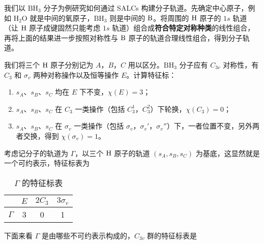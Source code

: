 
我们以 $\text{BH}_3$ 分子为例研究如何通过 SALCs 构建分子轨道。先确定中心原子，例如 $\text{H}_2\text{O}$ 就是中间的氧原子，$\text{BH}_3$ 则是中间的 $\text B$。将周围的 $\text H$ 原子的 $1s$ 轨道（让 $\text H$ 原子成键固然只能考虑 $1s$ 轨道）组合成\textbf{符合特定对称种类}的线性组合，再将上面的结果进一步按照对称性与 $\text B$ 原子的轨道合理线性组合，得到分子轨道。

我们将三个 $\text H$ 原子分别记为 $A$，$B$，$C$ 用以区分。$\text{BH}_3$ 分子应有 $C_{3v}$ 对称性，有 $C_3$ 和 $\sigma_v$ 两种对称操作以及恒等操作 $E$。计算特征标：
\begin{enumerate}
\item $s_A$、$s_B$、$s_C$ 均在 $E$ 下不变，$\chi(E)=3$；
\item $s_A$、$s_B$、$s_C$ 在 $C_3$ 一类操作（包括 $C_3^1$，$C_3^2$）下轮换，$\chi(C_3)=0$；
\item $s_A$、$s_B$、$s_C$ 在 $\sigma_v$ 一类操作（包括 $\sigma_v$，$\sigma_v'$，$\sigma_v''$）下，一者位置不变，另外两者交换，得到 $\chi(\sigma_v)=1$。
\end{enumerate}
考虑记分子的轨道为 $\Gamma$，以三个 $\text H$ 原子的轨道 $(s_A,s_B,s_C)$ 为基底，这显然就是一个可约表示，特征标表为
\begin{table}[ht]
\centering
\caption{$\Gamma$ 的特征标表}\label{tab_SALCs1}
\begin{tabular}{|c|c|c|c|}
\hline
 & $E$ & $2C_3$ & $3\sigma_v$ \\
\hline
$\Gamma$ & 3 & 0 & 1 \\
\hline
\end{tabular}
\end{table}
下面来看 $\Gamma$ 是由哪些不可约表示构成的，$C_{3v}$ 群的特征标表是
